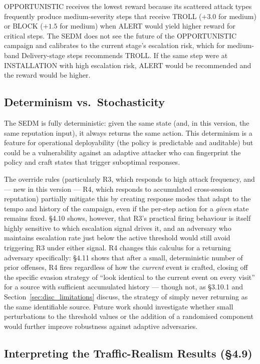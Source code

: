 OPPORTUNISTIC receives the lowest reward because its scattered attack types
frequently produce medium-severity steps that receive TROLL ($+3.0$ for
medium) or BLOCK ($+1.5$ for medium) when ALERT would yield higher reward
for critical steps.
The SEDM does not see the future of the OPPORTUNISTIC campaign and
calibrates to the current stage's escalation risk, which for medium-band
Delivery-stage steps recommends TROLL.
If the same step were at INSTALLATION with high escalation risk, ALERT
would be recommended and the reward would be higher.

\subsection{Determinism vs.\ Stochasticity}

The SEDM is fully deterministic: given the same state (and, in this
version, the same reputation input), it always returns the same action.
This determinism is a feature for operational deployability (the policy is
predictable and auditable) but could be a vulnerability against an adaptive
attacker who can fingerprint the policy and craft states that trigger
suboptimal responses.

The override rules (particularly R3, which responds to high attack
frequency, and --- new in this version --- R4, which responds to
accumulated cross-session reputation) partially mitigate this by creating
response modes that adapt to the tempo and history of the campaign, even
if the per-step action for a \emph{given} state remains fixed.
\S4.10 shows, however, that R3's practical firing behaviour is itself
highly sensitive to which escalation signal drives it, and an adversary who
maintains escalation rate just below the active threshold would still
avoid triggering R3 under either signal.
R4 changes this calculus for a returning adversary specifically: \S4.11
shows that after a small, deterministic number of prior offenses, R4 fires
regardless of how the \emph{current} event is crafted, closing off the
specific evasion strategy of ``look identical to the current event on
every visit'' for a source with sufficient accumulated history --- though
not, as \S3.10.1 and Section~\ref{sec:disc_limitations} discuss, the
strategy of simply never returning as the same identifiable source.
Future work should investigate whether small perturbations to the
threshold values or the addition of a randomised component would further
improve robustness against adaptive adversaries.

\subsection{Interpreting the Traffic-Realism Results (\S4.9)}
\label{sec:disc_realism}

